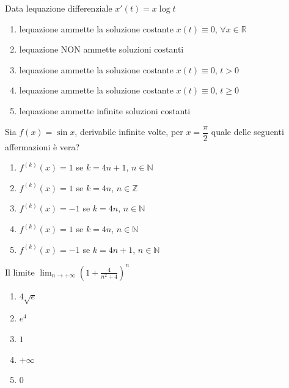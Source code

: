 \begin{quiz}
Data l\textquotesingle equazione differenziale $x\prime(t)=x\log t$
\begin{enumerate}
\item l\textquotesingle equazione ammette la soluzione costante $x(t)\equiv0$, $\forall x\in\mathbb R$
\item l\textquotesingle equazione NON ammette soluzioni costanti
\item l\textquotesingle equazione ammette la soluzione costante $x(t)\equiv0$, $t>0$
\item l\textquotesingle equazione ammette la soluzione costante $x(t)\equiv0$, $t\ge0$
\item l\textquotesingle equazione ammette infinite soluzioni costanti
\end{enumerate}
\end{quiz}

\begin{quiz}
Sia $f(x)=\sin x$, derivabile infinite volte, per $x=\dfrac\pi2$ quale delle seguenti affermazioni \`e vera?
\begin{enumerate}
\item $f^{(k)}(x)=1$ se $k=4n+1$, $n\in\mathbb N$
\item $f^{(k)}(x)=1$ se $k=4n$, $n\in\mathbb Z$
\item $f^{(k)}(x)=-1$ se $k=4n$, $n\in\mathbb N$
\item $f^{(k)}(x)=1$ se $k=4n$, $n\in\mathbb N$
\item $f^{(k)}(x)=-1$ se $k=4n+1$, $n\in\mathbb N$
\end{enumerate}
\end{quiz}

\begin{quiz}
Il limite $\displaystyle\lim_{n\to+\infty}\left(1+\frac4{n^2+4}\right)^n$
\begin{enumerate}
\item $4\sqrt e$
\item $e^4$
\item $1$
\item $+\infty$
\item $0$
\end{enumerate}
\end{quiz}

